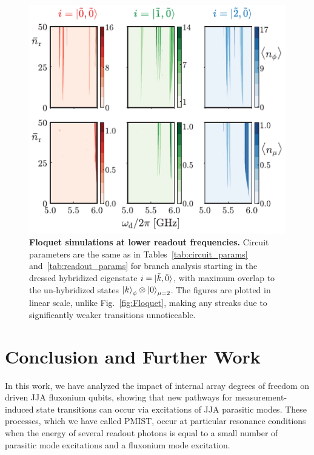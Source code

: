\documentclass[%
reprint,
superscriptaddress,
 amsmath,amssymb,
 aps,
 prx,
longbibliography,
floatfix,
]{revtex4-2}
\begin{document}
\begin{figure}[t]
    \centering
    \includegraphics[width=\linewidth]{Figures/Floquet_low.pdf}
    \caption{{\bf Floquet simulations at lower readout frequencies.} Circuit parameters are the same as in Tables~\ref{tab:circuit_params} and~\ref{tab:readout_params} for branch analysis starting in the dressed hybridized eigenstate $i=\ket{\tilde{k},\tilde{0}}$, with maximum overlap to the un-hybridized states $\ket{k}_\phi\otimes\ket{0}_{\mu=2}$. The figures are plotted in linear scale, unlike Fig.~\ref{fig:Floquet}, making any streaks due to significantly weaker transitions unnoticeable.}
    \label{fig:Flo_low}
\end{figure}


\section{Conclusion and Further Work}\label{sec:conclusion}
In this work, we have analyzed the impact of internal array degrees of freedom on driven JJA fluxonium qubits, showing that new pathways for measurement-induced state transitions can occur via excitations of JJA parasitic modes. These processes, which we have called PMIST, occur at particular resonance conditions when the energy of several readout photons is equal to a small number of parasitic mode excitations and a fluxonium mode excitation.
\end{document}
